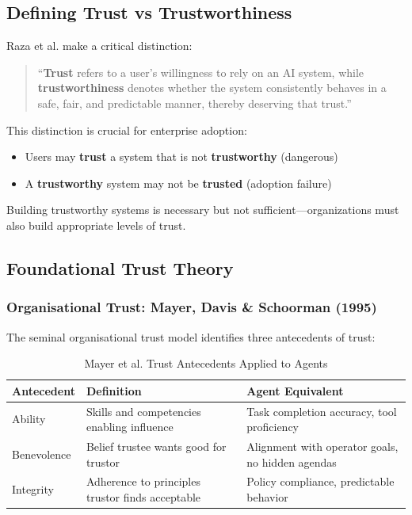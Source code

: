 \subsection{Defining Trust vs Trustworthiness}
\label{subsec:trust-vs-trustworthiness}

Raza et al. \citep{raza2025} make a critical distinction:

\begin{quote}
``\textbf{Trust} refers to a user's willingness to rely on an AI system, while \textbf{trustworthiness} denotes whether the system consistently behaves in a safe, fair, and predictable manner, thereby deserving that trust.''
\end{quote}

This distinction is crucial for enterprise adoption:
\begin{itemize}
    \item Users may \textbf{trust} a system that is not \textbf{trustworthy} (dangerous)
    \item A \textbf{trustworthy} system may not be \textbf{trusted} (adoption failure)
\end{itemize}

Building trustworthy systems is necessary but not sufficient---organizations must also build appropriate levels of trust.

\subsection{Foundational Trust Theory}
\label{subsec:foundational-trust}

\subsubsection{Organisational Trust: Mayer, Davis \& Schoorman (1995)}

The seminal organisational trust model identifies three antecedents of trust:

\begin{table}[htbp]
\centering
\caption{Mayer et al. Trust Antecedents Applied to Agents}
\label{tab:mayer-trust}
\begin{tabular}{lll}
\toprule
\textbf{Antecedent} & \textbf{Definition} & \textbf{Agent Equivalent} \\
\midrule
Ability & Skills and competencies enabling influence & Task completion accuracy, tool proficiency \\
Benevolence & Belief trustee wants good for trustor & Alignment with operator goals, no hidden agendas \\
Integrity & Adherence to principles trustor finds acceptable & Policy compliance, predictable behavior \\
\bottomrule
\end{tabular}
\end{table}

